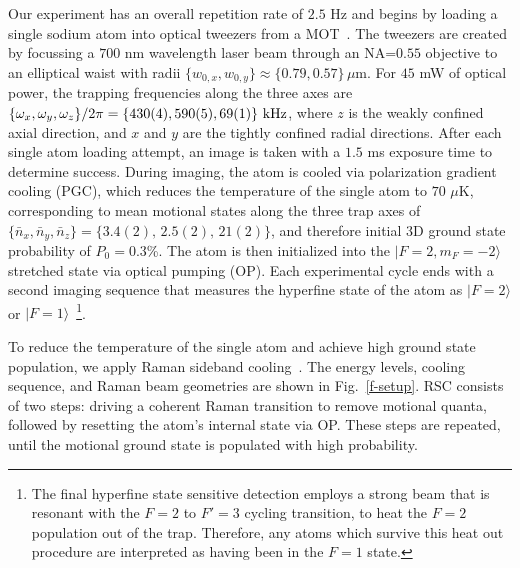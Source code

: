 \documentclass[aps,prl,twocolumn,groupedaddress]{revtex4-1}
\begin{document}
Our experiment has an overall repetition rate of $2.5$ Hz and
begins by loading a single sodium atom into optical tweezers from a MOT~\cite{Hutzler2017-LightShifts}.
The tweezers are created by focussing a $700$ nm wavelength laser beam through an NA=$0.55$ objective to an elliptical waist with radii $\{w_{0,x},w_{0,y}\}\approx \{0.79,0.57\}\,\mu$m.
For $45$ mW of optical power, the trapping frequencies along the three axes are
$\{\omega_x,\omega_y,\omega_z\}/2\pi = \{430(4), 590(5), 69(1)\}\ \text{\text{kHz}}$,
where  $z$ is the weakly confined axial direction,
and  $x$ and $y$ are the tightly confined radial directions.
After each single atom loading attempt, an image is taken with a $1.5$ ms exposure time
to determine success.
During  imaging, the atom is cooled via polarization gradient cooling (PGC),
which reduces the temperature of the single atom to $70$ $\mu$K,
corresponding to mean motional states along the three trap axes of
$\{\bar n_x, \bar n_y, \bar n_z\}=\{3.4(2),\, 2.5(2),\, 21(2)\}$, and therefore initial 3D ground state probability of $P_0=0.3$\%.
The atom is then initialized  into
the $|F=2, m_F=-2\rangle$ stretched state via optical pumping (OP).
Each experimental cycle ends with a second imaging sequence that measures the hyperfine state of the atom as $|F=2\rangle$ or $|F=1\rangle$~\footnote{The final hyperfine state sensitive detection employs a strong beam that is resonant with the $F=2$ to $F'=3$ cycling transition, to heat the $F=2$ population out of the trap.  Therefore, any atoms which survive this heat out procedure are interpreted as having been in the $F=1$ state.}.%


To  reduce the temperature of the single atom and
 achieve high ground state population, we apply Raman sideband cooling~\cite{Monroe1995, Kaufman2012}.
The  energy levels, cooling sequence, and Raman beam geometries
are shown in Fig.~\ref{f-setup}. RSC consists of two steps:
driving a coherent Raman transition  to remove motional quanta, followed by resetting the atom's internal state via OP.
These  steps are  repeated, until the motional ground state is populated with high probability.
\end{document}
